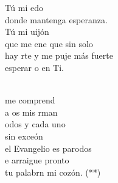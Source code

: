 \documentclass[12pt]{article}
\begin{document}
\begin{multicols*}{2}
\begin{cancion}
	 Tú mi edo \\
	donde mantenga  esperanza.\\
	 Tú mi uijón\\
	que me ene que sin solo \\
	hay rte y me puje más fuerte\\
	esperar o en Ti. \\\jump\\
	\begin{chorus}%
	me comprend \\
	a os mis rman  \\
	odos y cada uno\\
	sin exceón  \\
	el Evangelio es parodos\\
	e arraigue pronto\\
	tu palabrn mi cozón. (**)\\
	\end{chorus}%
	\jump\\
\end{cancion}%


\end{multicols*}
\end{document}
